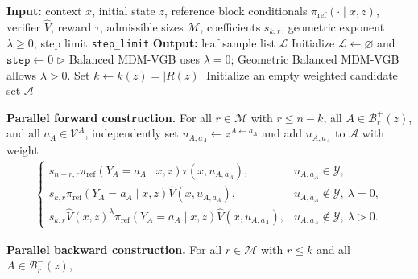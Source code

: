 \documentclass{article}
\numberwithin{theorem}{section}
\numberwithin{proposition}{section}
\numberwithin{corollary}{section}
\numberwithin{lemma}{section}
\numberwithin{conjecture}{section}
\numberwithin{remark}{section}
\numberwithin{definition}{section}
\numberwithin{assumption}{section}
\numberwithin{example}{section}
\newcommand{\calB}{{\mathcal{B}}}
\newcommand{\calM}{{\mathcal{M}}}
\newcommand{\calV}{{\mathcal{V}}}
\newcommand{\calY}{{\mathcal{Y}}}
\newcommand{\abs}[1]{\left| #1\right|}
\providecommand{\base}{\pi_{\mathrm{ref}}}
\begin{document}
\begin{algorithm}[h!]
\caption[MDM-VGB sampler with block coefficients, without a self-loop]{MDM-VGB sampler with block coefficients, without a self-loop
(\protect{} = parallelizable area)}
\label{alg:mdm_vgb_sampler}
\begin{algorithmic}[1]
\Statex \textbf{Input:} context $x$, initial state $z$, reference block conditionals $\base(\cdot\mid x,z)$, verifier $\widehat V$, reward $\tau$, admissible sizes $\calM$, coefficients $s_{k,r}$, geometric exponent $\lambda\ge0$, step limit \texttt{step\_limit}
\Statex \textbf{Output:} leaf sample list $\mathcal L$
\State Initialize $\mathcal L\gets\varnothing$ and $\texttt{step}\gets0$
\Statex \hspace{\algorithmicindent}$\triangleright$ Balanced MDM-VGB uses $\lambda=0$; Geometric Balanced MDM-VGB allows $\lambda>0$.
    \State Set $k\gets k(z)=\abs{R(z)}$
    \State Initialize an empty weighted candidate set $\mathcal A$
        \Statex \hspace*{\algorithmicindent}\colorbox{Lavender!25}{
        \parbox{0.88\linewidth}{
        \textbf{Parallel forward construction.}
        For all $r\in\calM$ with $r\le n-k$, all $A\in\calB_r^+(z)$, and all
        $a_A\in\calV^A$, independently set $u_{A,a_A}\gets z^{A\leftarrow a_A}$
        and add $u_{A,a_A}$ to $\mathcal A$ with weight
        \begin{align*}
            \begin{cases}
                s_{n-r,r}\base(Y_A=a_A\mid x,z)\tau(x,u_{A,a_A}),
                    & u_{A,a_A}\in\calY,\\
                s_{k,r}\base(Y_A=a_A\mid x,z)\widehat V(x,u_{A,a_A}),
                    & u_{A,a_A}\notin\calY,\ \lambda=0,\\
                s_{k,r}\widehat V(x,z)^\lambda
                \base(Y_A=a_A\mid x,z)\widehat V(x,u_{A,a_A}),
                    & u_{A,a_A}\notin\calY,\ \lambda>0.
            \end{cases}
        \end{align*}}}
    \EndIf
        \Statex \hspace*{\algorithmicindent}\colorbox{Lavender!25}{
        \parbox{0.88\linewidth}{
        \textbf{Parallel backward construction.}
        For all $r\in\calM$ with $r\le k$ and all $A\in\calB_r^-(z)$,
}}
\end{algorithmic}
\end{algorithm}
\end{document}
